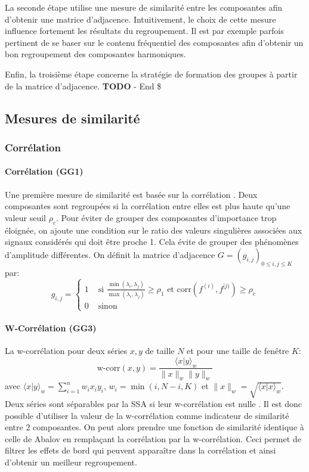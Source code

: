 \documentclass{gretsi}
\begin{document}
La seconde étape utilise une mesure de similarité entre les composantes afin d'obtenir une matrice d'adjacence. Intuitivement, le choix de cette mesure influence fortement les résultats du regroupement. Il est par exemple parfois pertinent de se  baser sur le contenu fréquentiel des composantes afin d'obtenir un bon regroupement des composantes harmoniques.

Enfin, la troisième étape concerne la stratégie de formation des groupes à partir de la matrice d'adjacence.  {\color{red} \textbf{TODO} - End \$} 

\subsection{Mesures de similarité}
\label{sub:sim}

\subsubsection{Corrélation}

\paragraph{Corrélation (GG1)}\label{par:GG1}
    Une première mesure de similarité est basée sur la corrélation \cite{abalov_14_auto}. Deux composantes sont regroupées si la corrélation entre elles est plus haute qu'une valeur seuil $\rho_c$. Pour éviter de grouper des composantes d'importance trop éloignée, on ajoute une condition sur le ratio des valeurs singulières associées aux signaux considérés qui doit être proche 1. Cela évite de grouper des phénomènes d'amplitude différentes. On définit la matrice d'adjacence $G = (g_{i, j})_{0 \le i,j\le K}$ par:
    $$
    g_{i, j} = \begin{cases}
	    1 &\text{ si } \displaystyle\frac{\min(\lambda_i, \lambda_j)}{\max(\lambda_i, \lambda_j)} \ge \rho_1 \text{ et } \text{corr}(f^{(i)}, f^{[j)}) \ge \rho_c\\
	    0& \text{ sinon}
    \end{cases}
    $$

\paragraph{W-Corrélation (GG3)}\label{par:GG3} 
    La w-corrélation pour deux séries $x, y$ de taille $N$ et pour une taille de fenêtre $K$:
    $$
    \text{w-corr}(x, y) = \frac{\langle x|y\rangle_w}{\|x\|_w\|y\|_w}
    $$avec $\langle x|y\rangle_w = \sum_{i=1}^n w_i x_i y_i$, $w_i = \min(i, N-i, K)$ et $\|x\|_w = \sqrt{\langle x|x\rangle_w}$. Deux séries sont séparables par la SSA si leur w-corrélation est nulle \cite{GNZ_10_SSA}. Il est donc possible d'utiliser la valeur de la w-corrélation comme indicateur de similarité entre 2 composantes. On peut alors prendre une fonction de similarité identique à celle de Abalov en remplaçant la corrélation par la w-corrélation. Ceci permet de filtrer les effets de bord qui peuvent apparaître dans la corrélation et ainsi d'obtenir un meilleur regroupement.
\end{document}
